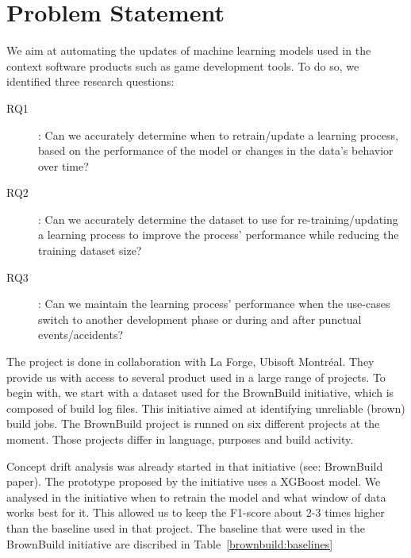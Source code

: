 \section{Problem Statement}



We aim at automating the updates of machine learning models used in the context software products such as game development tools. To do so, we identified three research questions: 

\begin{description}
	\item[RQ1]: Can we accurately determine when to retrain/update a learning process, based on the performance of the model or changes in the data’s behavior over time? 
	\item[RQ2]: Can we accurately determine the dataset to use for re-training/updating a learning process to improve the process’ performance while reducing the training dataset size?
	\item[RQ3]: Can we maintain the learning process’ performance when the use-cases switch to another development phase or during and after punctual events/accidents?
\end{description}

The project is done in collaboration with La Forge, Ubisoft Montréal. They provide us with access to several product used in a large range of projects. To begin with, we start with a dataset used for the BrownBuild initiative, which is composed of build log files. This initiative aimed at identifying unreliable (brown) build jobs.  The BrownBuild project is runned on six different projects at the moment. Those projects differ in language, purposes and build activity.

Concept drift analysis was already started in that initiative (see: BrownBuild paper). The prototype proposed by the initiative uses a XGBoost model. We analysed in the initiative when to retrain the model and what window of data works best for it. This allowed us to keep the F1-score about 2-3 times higher than the baseline used in that project. 
The baseline that were used in the BrownBuild initiative are discribed in Table~\ref{brownbuild:baselines}



